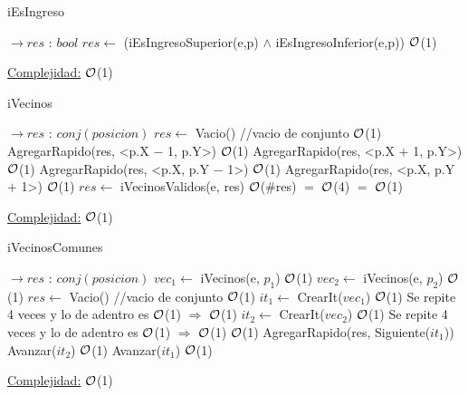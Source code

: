 \begin{Representacion}
\begin{Algoritmos}
	\begin{algorithm}
		\caption{iEsIngreso}
		\begin{algorithmic}
			 $\to res$ : $bool$
				\State $res \gets$ (iEsIngresoSuperior(e,p) $\land$ iEsIngresoInferior(e,p)) \Comment $\mathcal{O}$(1)
			\EndProcedure		
		\end{algorithmic}
		\underline{Complejidad:} $\mathcal{O}$(1)
	\end{algorithm}
	
	\begin{algorithm}
		\caption{iVecinos}
		\begin{algorithmic}
			 $\to res$ : $conj(posicion)$
				\State $res \gets$ Vacio() //vacio de conjunto \Comment $\mathcal{O}$(1)
				\State AgregarRapido(res, <p.X $-$ 1, p.Y>) \Comment $\mathcal{O}$(1)
				\State AgregarRapido(res, <p.X $+$ 1, p.Y>) \Comment $\mathcal{O}$(1)
				\State AgregarRapido(res, <p.X, p.Y $-$ 1>) \Comment $\mathcal{O}$(1)
				\State AgregarRapido(res, <p.X, p.Y $+$ 1>) \Comment $\mathcal{O}$(1)
				\State $res \gets$ iVecinosValidos(e, res) \Comment $\mathcal{O}$($\#$res) $=$ $\mathcal{O}$(4) $=$ $\mathcal{O}$(1)				
			\EndProcedure		
		\end{algorithmic}
		\underline{Complejidad:} $\mathcal{O}$(1)
	\end{algorithm}
		
	\begin{algorithm}
		\caption{iVecinosComunes}
		\begin{algorithmic}
			 $\to res$ : $conj(posicion)$
				\State $vec_1 \gets$ iVecinos(e, $p_1$) \Comment $\mathcal{O}$(1)
				\State $vec_2 \gets$ iVecinos(e, $p_2$) \Comment $\mathcal{O}$(1)
				\State $res \gets$ Vacio() //vacio de conjunto \Comment $\mathcal{O}$(1)
				\State $it_1 \gets$ CrearIt($vec_1$) \Comment $\mathcal{O}$(1)
				 \Comment Se repite 4 veces y lo de adentro es $\mathcal{O}$(1) $\Rightarrow$ $\mathcal{O}$(1)	
					\State $it_2 \gets$ CrearIt($vec_2$) \Comment $\mathcal{O}$(1)
					 \Comment Se repite 4 veces y lo de adentro es $\mathcal{O}$(1) $\Rightarrow$ $\mathcal{O}$(1)
						 \Comment $\mathcal{O}$(1)
							\State AgregarRapido(res, Siguiente($it_1$))
						\EndIf
						\State Avanzar($it_2$) \Comment $\mathcal{O}$(1)
					\EndWhile
					\State Avanzar($it_1$) \Comment $\mathcal{O}$(1)
				\EndWhile		
			\EndProcedure		
		\end{algorithmic}
		\underline{Complejidad:} $\mathcal{O}$(1)
	\end{algorithm}
			

\end{Algoritmos}
\end{Representacion}
